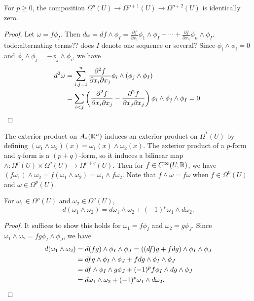 \begin{lemma}
    For $p\geq 0$, the composition $\Omega^p (U) \to \Omega^{p+1}(U)\to \Omega^{p+2}(U)$ is identically zero.
\end{lemma}
\begin{proof}
    Let $\omega=f \phi_I$. Then $d\omega=df\wedge \phi_I=\frac{\partial f}{\partial x_1}\phi_1\wedge \phi_I + \cdots + \frac{\partial f}{\partial x_n }\phi_n \wedge \phi_I.$ {\color{red}todo:alternating  terms?? does $I$ denote one sequence or several?} Since $\phi_i \wedge \phi_i =0 $ and $\phi_i \wedge\phi_j =-\phi_j \wedge \phi_i $, we have 
    \begin{align*}
        d^2\omega&= \sum_{i,j=1}^{n} \frac{\partial ^2 f}{\partial x_i \partial x_j }\phi_i  \wedge (\phi_j \wedge \phi_I)\\
                 &= \sum_{i<j}^{} \left( \frac{\partial ^2 f}{\partial x_i \partial x_j }-\frac{\partial ^2 f}{\partial x_j \partial x_j } \right) \phi_i \wedge \phi_j  \wedge \phi_I=0.\qedhere
    \end{align*}
\end{proof}
The exterior product on $A_*(\mathbb{R}^n )$ induces an exterior product on $\Omega^*(U)$ by defining $(\omega_1\wedge \omega_2)(x)=\omega_1(x)\wedge \omega_2(x)$. The exterior product of a $p$-form and $q$-form is a $(p+q)$-form, so it induces a bilinear map $\wedge \colon \Omega^p (U) \times \Omega^q(U) \to \Omega^{p+q}(U).$ Then for $f \in C^{\infty}(U,\mathbb{R})$, we have $(f\omega_1)\wedge \omega_2=f(\omega_1\wedge \omega_2)=\omega_1\wedge f\omega_2$. Note that $f\wedge \omega=f\omega$ when $f \in \Omega^0(U)$ and $\omega \in \Omega^p(U)$.

\begin{lemma}\label{product} 
    For $\omega_1 \in \Omega^p(U)$ and $\omega_2 \in \Omega^q(U)$, \[
        d(\omega_1\wedge \omega_2)=d\omega_1 \wedge \omega_2+(-1)^p\omega_1\wedge d\omega_2.
    \] 
\end{lemma}
\begin{proof}
    It suffices to show this holds for $\omega_1=f \phi_I$ and $\omega_2=g \phi_J$. Since $\omega_1\wedge \omega_2= fg \phi_I\wedge \phi_J$, we have 
    \begin{align*}
        d(\omega_1\wedge \omega_2)&=d(fg)\wedge \phi_I\wedge \phi_J=((df)g+fdg)\wedge \phi_I\wedge \phi_J\\
                                  &= df g\wedge \phi_I\wedge \phi_J + fdg \wedge \phi_I \wedge \phi_J \\
                                  &= df \wedge  \phi_I \wedge g\phi_J +(-1)^pf \phi_I \wedge dg\wedge \phi_J\\
                                  &=d\omega_1\wedge\omega_2 +(-1)^p \omega_1 \wedge d\omega_2.\qedhere
    \end{align*}
\end{proof}

